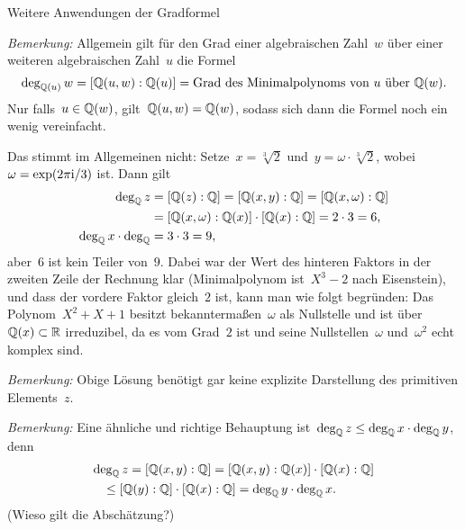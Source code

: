 \documentclass{algblatt}
\begin{document}
\begin{aufgabe}{Weitere Anwendungen der Gradformel}
\begin{loesungE}
\emph{Bemerkung:} Allgemein gilt für den Grad einer algebraischen Zahl~$w$ über
einer weiteren algebraischen Zahl~$u$ die Formel
\[ \deg_{\mathbb{Q}(u)} w = [\mathbb{Q}(u,w):\mathbb{Q}(u)] = \text{Grad des Minimalpolynoms
von~$u$ über~$\mathbb{Q}(w)$}. \]
Nur falls~$u \in \mathbb{Q}(w)$, gilt~$\mathbb{Q}(u,w) = \mathbb{Q}(w)$, sodass sich dann die Formel
noch ein wenig vereinfacht.

\item Das stimmt im Allgemeinen nicht: Setze~$x = \sqrt[3]{2}$ und~$y = \omega
\cdot \sqrt[3]{2}$, wobei~$\omega = \exp(2\pi\mathrm{i}/3)$ ist. Dann gilt
\begin{align*}
  \deg_{\mathbb{Q}} z &= [\mathbb{Q}(z):\mathbb{Q}] = [\mathbb{Q}(x,y):\mathbb{Q}] = [\mathbb{Q}(x,\omega):\mathbb{Q}] \\
  &= [\mathbb{Q}(x,\omega):\mathbb{Q}(x)] \cdot [\mathbb{Q}(x):\mathbb{Q}] = 2 \cdot 3 = 6, \\
  \deg_{\mathbb{Q}} x \cdot \deg_{\mathbb{Q}} &= 3 \cdot 3 = 9,
\end{align*}
aber~$6$ ist kein Teiler von~$9$.
Dabei war der Wert des hinteren Faktors in der zweiten Zeile der Rechnung klar (Minimalpolynom ist~$X^3 - 2$ nach
Eisenstein), und dass der vordere Faktor gleich~$2$ ist, kann man wie folgt
begründen: Das Polynom~$X^2 + X + 1$ besitzt bekanntermaßen~$\omega$ als
Nullstelle und ist über~$\mathbb{Q}(x) \subset \mathbb{R}$ irreduzibel, da es vom Grad~$2$
ist und seine Nullstellen~$\omega$ und~$\omega^2$ echt komplex sind.

\emph{Bemerkung:} Obige Lösung benötigt gar keine explizite Darstellung des
primitiven Elements~$z$.

\emph{Bemerkung:}
Eine ähnliche und richtige Behauptung ist~$\deg_{\mathbb{Q}} z \leq
\deg_{\mathbb{Q}} x \cdot \deg_{\mathbb{Q}} y$, denn
\begin{multline*}\deg_{\mathbb{Q}} z = [\mathbb{Q}(x,y):\mathbb{Q}] = [\mathbb{Q}(x,y):\mathbb{Q}(x)] \cdot
  [\mathbb{Q}(x):\mathbb{Q}] \\ \leq [\mathbb{Q}(y):\mathbb{Q}] \cdot [\mathbb{Q}(x):\mathbb{Q}] =
  \deg_{\mathbb{Q}} y \cdot \deg_{\mathbb{Q}} x. {\qquad}\end{multline*}
(Wieso gilt die Abschätzung?)
\end{loesungE}
\end{aufgabe}
\end{document}
